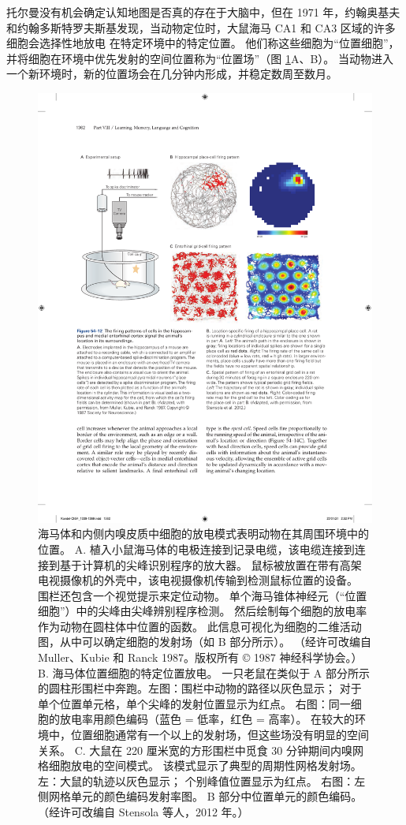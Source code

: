托尔曼没有机会确定认知地图是否真的存在于大脑中，但在 1971 年，约翰奥基夫和约翰多斯特罗夫斯基发现，当动物定位时，大鼠海马 CA1 和 CA3 区域的许多细胞会选择性地放电 在特定环境中的特定位置。
他们称这些细胞为“位置细胞”，并将细胞在环境中优先发射的空间位置称为“位置场”（图 \ref{fig:54_12}A、B）。
当动物进入一个新环境时，新的位置场会在几分钟内形成，并稳定数周至数月。


\begin{figure}[htbp]
	\centering
	\includegraphics[width=0.9\linewidth]{chap54/fig_54_12}
	\caption{海马体和内侧内嗅皮质中细胞的放电模式表明动物在其周围环境中的位置。 A. 植入小鼠海马体的电极连接到记录电缆，该电缆连接到连接到基于计算机的尖峰识别程序的放大器。 鼠标被放置在带有高架电视摄像机的外壳中，该电视摄像机传输到检测鼠标位置的设备。 围栏还包含一个视觉提示来定位动物。 单个海马锥体神经元（“位置细胞”）中的尖峰由尖峰辨别程序检测。 然后绘制每个细胞的放电率作为动物在圆柱体中位置的函数。 此信息可视化为细胞的二维活动图，从中可以确定细胞的发射场（如 B 部分所示）。 （经许可改编自 Muller、Kubie 和 Ranck 1987。版权所有 © 1987 神经科学协会。） B. 海马体位置细胞的特定位置放电。 一只老鼠在类似于 A 部分所示的圆柱形围栏中奔跑。左图：围栏中动物的路径以灰色显示； 对于单个位置单元格，单个尖峰的发射位置显示为红点。 右图：同一细胞的放电率用颜色编码（蓝色 = 低率，红色 = 高率）。 在较大的环境中，位置细胞通常有一个以上的发射场，但这些场没有明显的空间关系。 C. 大鼠在 220 厘米宽的方形围栏中觅食 30 分钟期间内嗅网格细胞放电的空间模式。 该模式显示了典型的周期性网格发射场。 左：大鼠的轨迹以灰色显示； 个别峰值位置显示为红点。 右图：左侧网格单元的颜色编码发射率图。 B 部分中位置单元的颜色编码。（经许可改编自 Stensola 等人，2012 年。）}
	\label{fig:54_12}
\end{figure}


